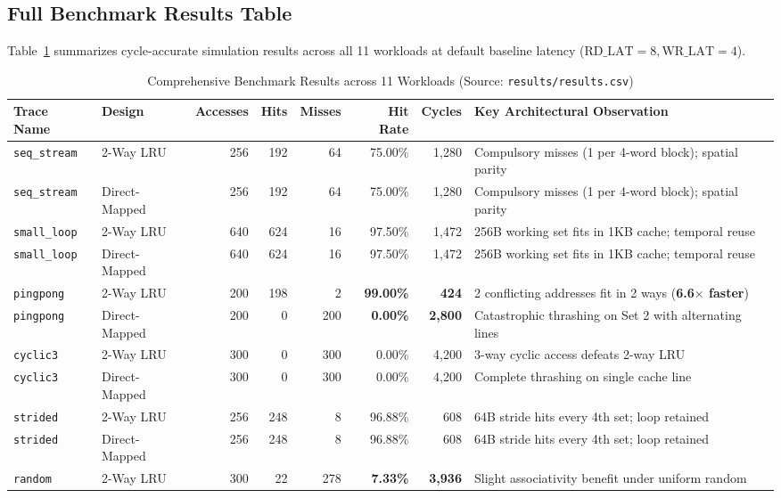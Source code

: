 \documentclass[journal,10pt,twocolumn]{IEEEtran}
\begin{document}
\subsection{Full Benchmark Results Table}
Table~\ref{tab:results} summarizes cycle-accurate simulation results across all 11 workloads at default baseline latency ($\text{RD\_LAT}=8, \text{WR\_LAT}=4$).

\begin{table}[htbp]
\centering
\caption{Comprehensive Benchmark Results across 11 Workloads (Source: \texttt{results/results.csv})}
\label{tab:results}
\begin{tabular}{llrrrrrl}
\toprule
\textbf{Trace Name} & \textbf{Design} & \textbf{Accesses} & \textbf{Hits} & \textbf{Misses} & \textbf{Hit Rate} & \textbf{Cycles} & \textbf{Key Architectural Observation} \\
\midrule
\texttt{seq\_stream} & 2-Way LRU & 256 & 192 & 64 & 75.00\% & 1,280 & Compulsory misses (1 per 4-word block); spatial parity \\
\texttt{seq\_stream} & Direct-Mapped & 256 & 192 & 64 & 75.00\% & 1,280 & Compulsory misses (1 per 4-word block); spatial parity \\
\midrule
\texttt{small\_loop} & 2-Way LRU & 640 & 624 & 16 & 97.50\% & 1,472 & 256B working set fits in 1KB cache; temporal reuse \\
\texttt{small\_loop} & Direct-Mapped & 640 & 624 & 16 & 97.50\% & 1,472 & 256B working set fits in 1KB cache; temporal reuse \\
\midrule
\texttt{pingpong} & 2-Way LRU & 200 & 198 & 2 & \textbf{99.00\%} & \textbf{424} & 2 conflicting addresses fit in 2 ways (\textbf{6.6$\times$ faster}) \\
\texttt{pingpong} & Direct-Mapped & 200 & 0 & 200 & \textbf{0.00\%} & \textbf{2,800} & Catastrophic thrashing on Set 2 with alternating lines \\
\midrule
\texttt{cyclic3} & 2-Way LRU & 300 & 0 & 300 & 0.00\% & 4,200 & 3-way cyclic access defeats 2-way LRU \\
\texttt{cyclic3} & Direct-Mapped & 300 & 0 & 300 & 0.00\% & 4,200 & Complete thrashing on single cache line \\
\midrule
\texttt{strided} & 2-Way LRU & 256 & 248 & 8 & 96.88\% & 608 & 64B stride hits every 4th set; loop retained \\
\texttt{strided} & Direct-Mapped & 256 & 248 & 8 & 96.88\% & 608 & 64B stride hits every 4th set; loop retained \\
\midrule
\texttt{random} & 2-Way LRU & 300 & 22 & 278 & \textbf{7.33\%} & \textbf{3,936} & Slight associativity benefit under uniform random \\

\end{tabular}
\end{table}
\end{document}
